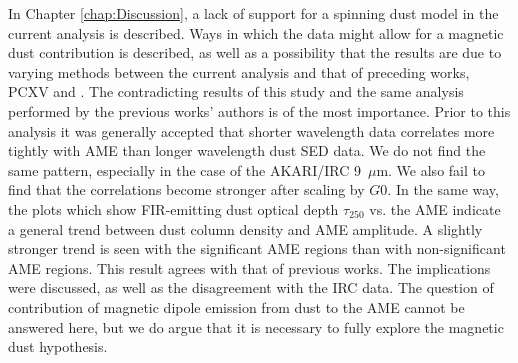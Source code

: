      In Chapter \ref{chap:Discussion}, a lack of support for a spinning dust model in the current analysis is described. Ways in which the data might allow for a magnetic dust contribution is described, as well as a possibility that the results are due to varying methods between the current analysis and that of preceding works, PCXV and \cite{ysard10a}. The contradicting results of this study and the same analysis performed by the previous works' authors is of the most importance. Prior to this analysis it was generally accepted that shorter wavelength data correlates more tightly with AME than longer wavelength dust SED data. We do not find the same pattern, especially in the case of the AKARI/IRC 9~$\mu$m. We also fail to find that the correlations become stronger after scaling by $G0$.
     In the same way, the plots which show FIR-emitting dust optical depth $\tau_{250}$ vs. the AME indicate a general trend between dust column density and AME amplitude. A slightly stronger trend is seen with the significant AME regions than with non-significant AME regions. This result agrees with that of previous works. The implications were discussed, as well as the disagreement with the IRC data. The question of contribution of magnetic dipole emission from dust to the AME cannot be answered here, but we do argue that it is necessary to fully explore the magnetic dust hypothesis.